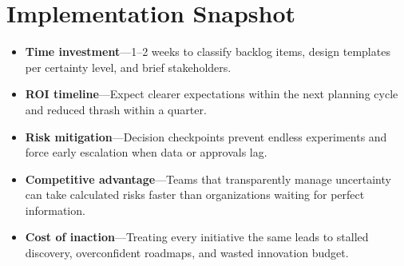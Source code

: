 \section{Implementation Snapshot}
\label{sec:uncertainty-snapshot}
\begin{itemize}
    \item \textbf{Time investment}—1--2 weeks to classify backlog items, design templates per certainty level, and brief stakeholders.
    \item \textbf{ROI timeline}—Expect clearer expectations within the next planning cycle and reduced thrash within a quarter.
    \item \textbf{Risk mitigation}—Decision checkpoints prevent endless experiments and force early escalation when data or approvals lag.
    \item \textbf{Competitive advantage}—Teams that transparently manage uncertainty can take calculated risks faster than organizations waiting for perfect information.
    \item \textbf{Cost of inaction}—Treating every initiative the same leads to stalled discovery, overconfident roadmaps, and wasted innovation budget.
\end{itemize}
